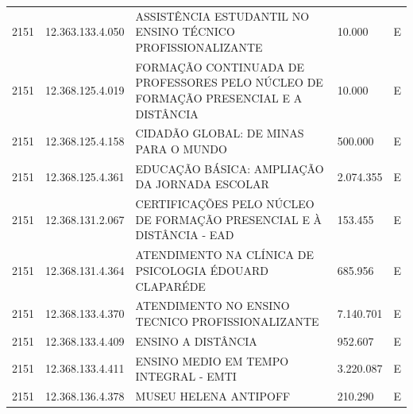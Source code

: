 \documentclass{article}
\begin{document}
\begin{longtable}[c]{m{1cm}|m{2cm}|m{10cm}|m{2cm}|m{1cm}}
\multicolumn{1}{C{1cm}|}{2151} & \multicolumn{1}{C{2cm}|}{12.363.133.4.050} & \multicolumn{1}{L{10cm}|}{ASSISTÊNCIA ESTUDANTIL NO ENSINO TÉCNICO PROFISSIONALIZANTE} & \multicolumn{1}{R{2cm}|}{10.000} & \multicolumn{1}{C{1cm}}{E} \\
\multicolumn{1}{C{1cm}|}{2151} & \multicolumn{1}{C{2cm}|}{12.368.125.4.019} & \multicolumn{1}{L{10cm}|}{FORMAÇÃO CONTINUADA DE PROFESSORES PELO NÚCLEO DE FORMAÇÃO PRESENCIAL E A DISTÂNCIA} & \multicolumn{1}{R{2cm}|}{10.000} & \multicolumn{1}{C{1cm}}{E} \\
\multicolumn{1}{C{1cm}|}{2151} & \multicolumn{1}{C{2cm}|}{12.368.125.4.158} & \multicolumn{1}{L{10cm}|}{CIDADÃO GLOBAL: DE MINAS PARA O MUNDO} & \multicolumn{1}{R{2cm}|}{500.000} & \multicolumn{1}{C{1cm}}{E} \\
\multicolumn{1}{C{1cm}|}{2151} & \multicolumn{1}{C{2cm}|}{12.368.125.4.361} & \multicolumn{1}{L{10cm}|}{EDUCAÇÃO BÁSICA: AMPLIAÇÃO DA JORNADA ESCOLAR} & \multicolumn{1}{R{2cm}|}{2.074.355} & \multicolumn{1}{C{1cm}}{E} \\
\multicolumn{1}{C{1cm}|}{2151} & \multicolumn{1}{C{2cm}|}{12.368.131.2.067} & \multicolumn{1}{L{10cm}|}{CERTIFICAÇÕES PELO NÚCLEO DE FORMAÇÃO PRESENCIAL E À DISTÂNCIA - EAD} & \multicolumn{1}{R{2cm}|}{153.455} & \multicolumn{1}{C{1cm}}{E} \\
\multicolumn{1}{C{1cm}|}{2151} & \multicolumn{1}{C{2cm}|}{12.368.131.4.364} & \multicolumn{1}{L{10cm}|}{ATENDIMENTO NA CLÍNICA DE PSICOLOGIA ÉDOUARD CLAPARÉDE} & \multicolumn{1}{R{2cm}|}{685.956} & \multicolumn{1}{C{1cm}}{E} \\
\multicolumn{1}{C{1cm}|}{2151} & \multicolumn{1}{C{2cm}|}{12.368.133.4.370} & \multicolumn{1}{L{10cm}|}{ATENDIMENTO NO ENSINO TECNICO PROFISSIONALIZANTE} & \multicolumn{1}{R{2cm}|}{7.140.701} & \multicolumn{1}{C{1cm}}{E} \\
\multicolumn{1}{C{1cm}|}{2151} & \multicolumn{1}{C{2cm}|}{12.368.133.4.409} & \multicolumn{1}{L{10cm}|}{ENSINO A DISTÂNCIA} & \multicolumn{1}{R{2cm}|}{952.607} & \multicolumn{1}{C{1cm}}{E} \\
\multicolumn{1}{C{1cm}|}{2151} & \multicolumn{1}{C{2cm}|}{12.368.133.4.411} & \multicolumn{1}{L{10cm}|}{ENSINO MEDIO EM TEMPO INTEGRAL - EMTI} & \multicolumn{1}{R{2cm}|}{3.220.087} & \multicolumn{1}{C{1cm}}{E} \\
\multicolumn{1}{C{1cm}|}{2151} & \multicolumn{1}{C{2cm}|}{12.368.136.4.378} & \multicolumn{1}{L{10cm}|}{MUSEU HELENA ANTIPOFF} & \multicolumn{1}{R{2cm}|}{210.290} & \multicolumn{1}{C{1cm}}{E} \\

\end{longtable}
\end{document}
